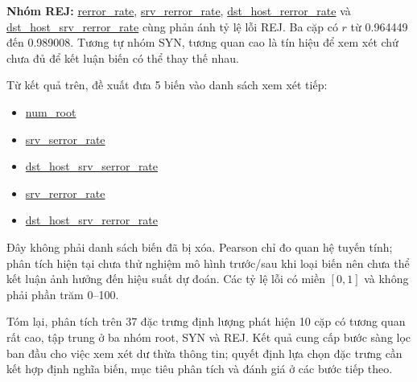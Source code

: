 \documentclass[12pt,a4paper]{article}
\begin{document}
\textbf{Nhóm REJ:} \url{rerror_rate}, \url{srv_rerror_rate}, \url{dst_host_rerror_rate} và \url{dst_host_srv_rerror_rate} cùng phản ánh tỷ lệ lỗi REJ. Ba cặp có $r$ từ 0.964449 đến 0.989008. Tương tự nhóm SYN, tương quan cao là tín hiệu để xem xét chứ chưa đủ để kết luận biến có thể thay thế nhau.

Từ kết quả trên, đề xuất đưa 5 biến vào danh sách xem xét tiếp:
\begin{itemize}
  \item \url{num_root}
  \item \url{srv_serror_rate}
  \item \url{dst_host_srv_serror_rate}
  \item \url{srv_rerror_rate}
  \item \url{dst_host_srv_rerror_rate}
\end{itemize}
   
Đây không phải danh sách biến đã bị xóa. Pearson chỉ đo quan hệ tuyến tính; phân tích hiện tại chưa thử nghiệm mô hình trước/sau khi loại biến nên chưa thể kết luận ảnh hưởng đến hiệu suất dự đoán. Các tỷ lệ lỗi có miền $[0,1]$ và không phải phần trăm 0--100.

Tóm lại, phân tích trên 37 đặc trưng định lượng phát hiện 10 cặp có tương quan rất cao, tập trung ở ba nhóm root, SYN và REJ. Kết quả cung cấp bước sàng lọc ban đầu cho việc xem xét dư thừa thông tin; quyết định lựa chọn đặc trưng cần kết hợp định nghĩa biến, mục tiêu phân tích và đánh giá ở các bước tiếp theo.

\printbibliography[title={Tài liệu tham khảo}]
\end{document}
